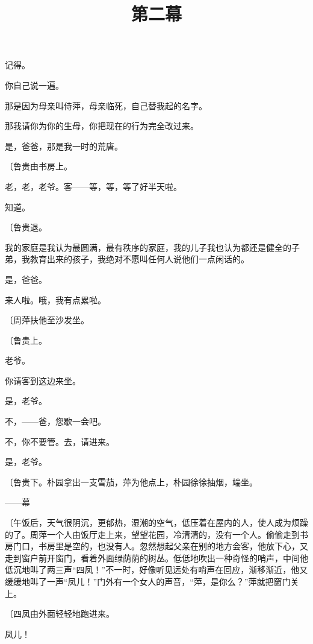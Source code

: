 记得。

你自己说一遍。

那是因为母亲叫侍萍，母亲临死，自己替我起的名字。

那我请你为你的生母，你把现在的行为完全改过来。

是，爸爸，那是我一时的荒唐。

{\fangsong〔鲁贵由书房上。}

老，老，老爷。客——等，等，等了好半天啦。

知道。

{\fangsong〔鲁贵退。}

我的家庭是我认为最圆满，最有秩序的家庭，我的儿子我也认为都还是健全的子弟，我教育出来的孩子，我绝对不愿叫任何人说他们一点闲话的。

是，爸爸。

来人啦。哦，我有点累啦。

{\fangsong〔周萍扶他至沙发坐。}

{\fangsong〔鲁贵上。}

老爷。

你请客到这边来坐。

是，老爷。

不，——爸，您歇一会吧。

不，你不要管。去，请进来。

是，老爷。

{\fangsong〔鲁贵下。朴园拿出一支雪茄，萍为他点上，朴园徐徐抽烟，端坐。}

\centerline{——幕}

\title{第二幕}

{\fangsong〔午饭后，天气很阴沉，更郁热，湿潮的空气，低压着在屋内的人，使人成为烦躁的了。周萍一个人由饭厅走上来，望望花园，冷清清的，没有一个人。偷偷走到书房门口，书房里是空的，也没有人。忽然想起父亲在别的地方会客，他放下心，又走到窗户前开窗门，看着外面绿荫荫的树丛。低低地吹出一种奇怪的哨声，中间他低沉地叫了两三声“四凤！”不一时，好像听见远处有哨声在回应，渐移渐近，他又缓缓地叫了一声“凤儿！”门外有一个女人的声音，“萍，是你么？”萍就把窗门关上。}

{\fangsong〔四凤由外面轻轻地跑进来。}

凤儿！

